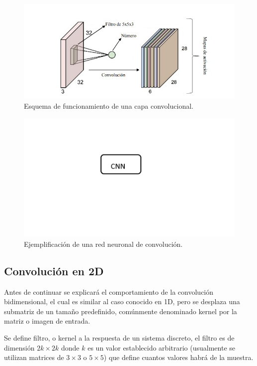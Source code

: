 \begin{figure}
    \centering
    \includegraphics[width=1\textwidth]{imgs/capa-convolucional.jpeg}
    \caption{Esquema de funcionamiento de una capa convolucional.}
    \label{fig:esquema-capa-convolucional}
\end{figure}
\begin{figure}
    \centering
    \includegraphics[width=1\textwidth]{imgs/CNN-completa.jpg}
    \caption{Ejemplificación de una red neuronal de convolución.}
    \label{fig:esquema-CNN}
\end{figure}

\subsection{Convolución en 2D}

Antes de continuar se explicará el comportamiento de la convolución bidimensional, el cual es similar al caso conocido en 1D, pero se desplaza una submatriz de un tamaño predefinido, comúnmente denominado kernel por la matriz o imagen de entrada.

Se define filtro, o kernel a la respuesta de un sistema discreto, el filtro es de dimensión $2k \times 2k$ donde $k$ es un
valor establecido arbitrario (usualmente se utilizan matrices de $3 \times 3$ o $5 \times 5$) que define cuantos valores habrá de la muestra.

